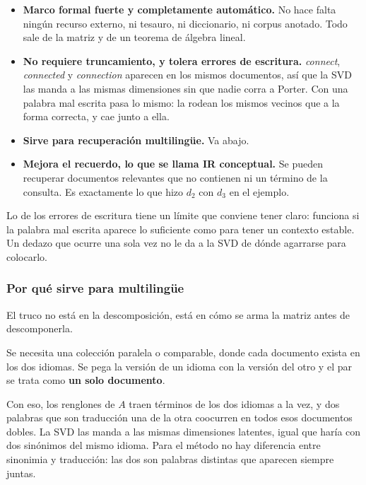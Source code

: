 \documentclass[11pt,letterpaper]{article}
\begin{document}
\begin{itemize}[itemsep=0.35em]
    \item \textbf{Marco formal fuerte y completamente automático.} No
          hace falta ningún recurso externo, ni tesauro, ni
          diccionario, ni corpus anotado. Todo sale de la matriz y de
          un teorema de álgebra lineal.
    \item \textbf{No requiere truncamiento, y tolera errores de
          escritura.} \textit{connect}, \textit{connected} y
          \textit{connection} aparecen en los mismos documentos, así
          que la SVD las manda a las mismas dimensiones sin que nadie
          corra a Porter. Con una palabra mal escrita pasa lo mismo:
          la rodean los mismos vecinos que a la forma correcta, y cae
          junto a ella.
    \item \textbf{Sirve para recuperación multilingüe.} Va abajo.
    \item \textbf{Mejora el recuerdo, lo que se llama IR conceptual.}
          Se pueden recuperar documentos relevantes que no contienen
          ni un término de la consulta. Es exactamente lo que hizo
          $d_2$ con $d_3$ en el ejemplo.
\end{itemize}

\begin{ojo}
    Lo de los errores de escritura tiene un límite que conviene tener
    claro: funciona si la palabra mal escrita aparece lo suficiente
    como para tener un contexto estable. Un dedazo que ocurre una sola
    vez no le da a la SVD de dónde agarrarse para colocarlo.
\end{ojo}

\subsubsection*{Por qué sirve para multilingüe}

El truco no está en la descomposición, está en cómo se arma la matriz
antes de descomponerla.

Se necesita una colección paralela o comparable, donde cada documento
exista en los dos idiomas. Se pega la versión de un idioma con la
versión del otro y el par se trata como \textbf{un solo documento}.

Con eso, los renglones de $A$ traen términos de los dos idiomas a la
vez, y dos palabras que son traducción una de la otra coocurren en
todos esos documentos dobles. La SVD las manda a las mismas
dimensiones latentes, igual que haría con dos sinónimos del mismo
idioma. Para el método no hay diferencia entre sinonimia y traducción:
las dos son palabras distintas que aparecen siempre juntas.
\end{document}
